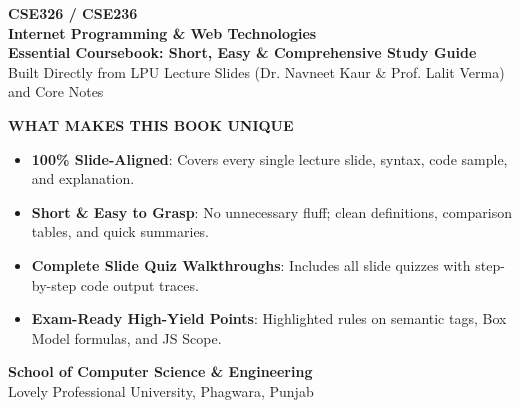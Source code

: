 \begin{titlepage}
\begin{center}
\vspace*{10mm}
{\Huge\sffamily\bfseries\color{DeepNavy} CSE326 / CSE236}\\[3mm]
{\LARGE\sffamily\bfseries\color{TealBlue} Internet Programming \& Web Technologies}\\[6mm]
{\Large\sffamily\bfseries Essential Coursebook: Short, Easy \& Comprehensive Study Guide}\\[4mm]
{\large\color{DarkSlate} Built Directly from LPU Lecture Slides (Dr. Navneet Kaur \& Prof. Lalit Verma) and Core Notes}\\[15mm]

\begin{tcolorbox}[enhanced,colback=LightBg,colframe=DeepNavy,arc=3mm,width=0.9\textwidth,boxrule=1.5pt]
\centering\vspace{2mm}
{\large\sffamily\bfseries\color{DeepNavy} WHAT MAKES THIS BOOK UNIQUE}\\[3mm]
\begin{itemize}[leftmargin=8mm,itemsep=1.5mm]
  \item \textbf{100\% Slide-Aligned}: Covers every single lecture slide, syntax, code sample, and explanation.
  \item \textbf{Short \& Easy to Grasp}: No unnecessary fluff; clean definitions, comparison tables, and quick summaries.
  \item \textbf{Complete Slide Quiz Walkthroughs}: Includes all slide quizzes with step-by-step code output traces.
  \item \textbf{Exam-Ready High-Yield Points}: Highlighted rules on semantic tags, Box Model formulas, and JS Scope.
\end{itemize}
\vspace{2mm}
\end{tcolorbox}

\vfill
{\large\sffamily\bfseries School of Computer Science \& Engineering}\\
{\large Lovely Professional University, Phagwara, Punjab}
\end{center}
\end{titlepage}
